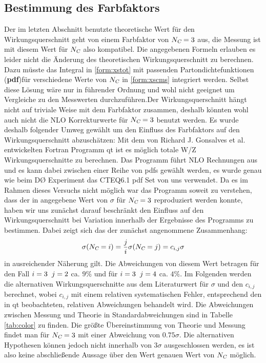 \documentclass[a4paper,12pt]{article}
\begin{document}
\subsection{Bestimmung des Farbfaktors}
Der im letzten Abschnitt benutzte theoretische Wert für den Wirkungsquerschnitt geht von einem Farbfaktor von $N_{\textsl{C}}=3$ aus, die
Messung ist mit diesem Wert für $N_{\textsl{C}}$ also kompatibel. Die angegebenen Formeln erlauben es leider nicht die Änderung des theoretischen
Wirkungsquerschnitt zu berechnen. Dazu müsste das Integral in \ref{form:xstot} mit passenden  Partondichtefunktionen (\textbf{pdf})für verschiedene Werte
von $N_{\textsl{C}}$ in \ref{form:xscms} integriert werden. Selbst diese Lösung wäre nur in führender Ordnung und wohl nicht geeignet um Vergleiche
zu den Messwerten durchzuführen.Der Wirkungsquerschnitt hängt nicht auf triviale Weise mit dem Farbfaktor zusammen, deshalb könnten wohl auch nicht die
NLO Korrekturwerte für $N_{\textsl{C}}=3$ benutzt werden. Es wurde deshalb folgender Umweg gewählt um den Einfluss des Farbfaktors auf den
Wirkungsquerschnitt abzuschätzen:
Mit dem von Richard J. Gonsalves et al. entwickelten Fortran Programm qt \cite{qtsite} ist es möglich totale W/Z  Wirkungsquerschnitte
zu berechnen. Das Programm führt NLO Rechnungen aus und es kann dabei zwischen einer Reihe von pdfs gewählt werden, es wurde genau wie beim
DØ Experiment \cite{Abachi:1996ey} das CTEQ6.1 pdf Set von uns verwendet. Da es im Rahmen dieses Versuchs nicht möglich war das Programm
soweit zu verstehen, dass der in \cite{versuchsanleitung} angegebene Wert von $\sigma$ für $N_{\textsl{C}}=3$ reproduziert werden konnte, haben
wir uns zunächst darauf beschränkt den Einfluss auf den Wirkungsquerschnitt bei Variation innerhalb der Ergebnisse des Programms zu bestimmen.
Dabei zeigt sich das der zunächst angenommene Zusammenhang:
  \begin{align*}
	  \sigma (N_{\textsl{C}}= i) = \frac{j}{i} \sigma (N_{\textsl{C}}= j) = c_{i,j} \sigma
  \end{align*}
in ausreichender Näherung gilt. Die Abweichungen von diesem Wert betragen für den Fall $i=3 \hspace{0.2cm} j=2$ ca. $9\% $ und für $i=3 \hspace{0.2cm} j=4$
ca. $4\% $. Im Folgenden werden die alternativen Wirkungsquerschnitte aus dem Literaturwert für $\sigma $ und den $c_{i,j}$ berechnet,
wobei $c_{i,j}$ mit einem relativen systematischen Fehler, entsprechend den in qt beobachteten, relativen Abweichungen behandelt wird.
 Die Abweichungen zwischen Messung und Theorie in Standardabweichungen sind in Tabelle \ref{tab:color} zu finden. Die größte Übereinstimmung
 von Theorie und Messung findet man für $N_{\textsl{C}}= 3$ mit einer Abweichung von $0.75\sigma$. Die alternativen Hypothesen können jedoch
 nicht innerhalb von $3\sigma$ ausgeschlossen werden, es ist also keine abschließende Aussage über den Wert genauen Wert von $N_{\textsl{C}}$ möglich.
\end{document}

